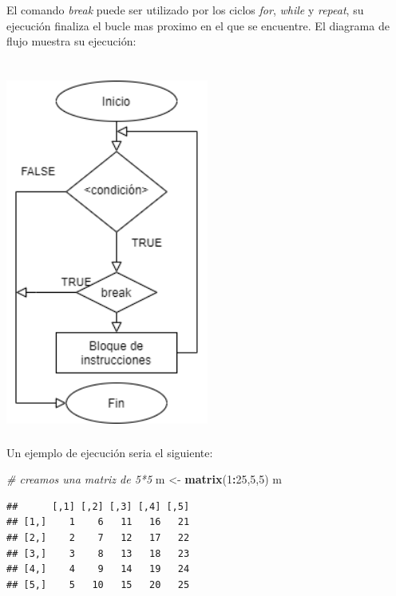 \documentclass[11pt,]{article}
\newenvironment{Shaded}{\begin{snugshade}}{\end{snugshade}}
\newcommand{\CommentTok}[1]{\textcolor[rgb]{0.56,0.35,0.01}{\textit{#1}}}
\newcommand{\DecValTok}[1]{\textcolor[rgb]{0.00,0.00,0.81}{#1}}
\newcommand{\KeywordTok}[1]{\textcolor[rgb]{0.13,0.29,0.53}{\textbf{#1}}}
\newcommand{\NormalTok}[1]{#1}
\newcommand{\OperatorTok}[1]{\textcolor[rgb]{0.81,0.36,0.00}{\textbf{#1}}}
\newcommand{\StringTok}[1]{\textcolor[rgb]{0.31,0.60,0.02}{#1}}
\begin{document}
El comando \emph{break} puede ser utilizado por los ciclos \emph{for},
\emph{while} y \emph{repeat}, su ejecución finaliza el bucle mas proximo
en el que se encuentre. El diagrama de flujo muestra su ejecución:

\hypertarget{ciclo-break}{%
\section{\texorpdfstring{\protect\includegraphics[width=0.5\textwidth,height=0.3\textheight]{../schemas/BREAK.png}}{Ciclo BREAK}}\label{ciclo-break}}

Un ejemplo de ejecución seria el siguiente:

\begin{Shaded}
\begin{Highlighting}[]
\CommentTok{# creamos una matriz de 5*5}
\NormalTok{m <-}\StringTok{  }\KeywordTok{matrix}\NormalTok{(}\DecValTok{1}\OperatorTok{:}\DecValTok{25}\NormalTok{,}\DecValTok{5}\NormalTok{,}\DecValTok{5}\NormalTok{)}
\NormalTok{m}
\end{Highlighting}
\end{Shaded}

\begin{verbatim}
##      [,1] [,2] [,3] [,4] [,5]
## [1,]    1    6   11   16   21
## [2,]    2    7   12   17   22
## [3,]    3    8   13   18   23
## [4,]    4    9   14   19   24
## [5,]    5   10   15   20   25
\end{verbatim}
\end{document}
